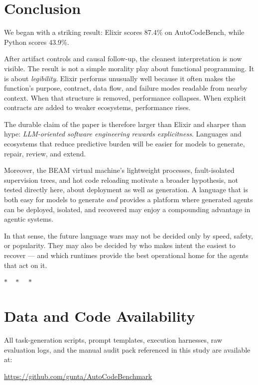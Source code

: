 \documentclass[11pt]{article}
\newcommand{\acb}{AutoCodeBench}
\newcommand{\elixir}{Elixir}
\newcommand{\pythonlang}{Python}
\begin{document}
\section{Conclusion}

We began with a striking result: \elixir{} scores 87.4\% on \acb{}, while \pythonlang{} scores 43.9\%.

After artifact controls and causal follow-up, the cleanest interpretation is now visible. The result is not a simple morality play about functional programming. It is about \emph{legibility}. \elixir{} performs unusually well because it often makes the function's purpose, contract, data flow, and failure modes readable from nearby context. When that structure is removed, performance collapses. When explicit contracts are added to weaker ecosystems, performance rises.

The durable claim of the paper is therefore larger than \elixir{} and sharper than hype: \emph{LLM-oriented software engineering rewards explicitness}. Languages and ecosystems that reduce predictive burden will be easier for models to generate, repair, review, and extend.

Moreover, the BEAM virtual machine's lightweight processes, fault-isolated supervision trees, and hot code reloading motivate a broader hypothesis, not tested directly here, about deployment as well as generation. A language that is both easy for models to generate \emph{and} provides a platform where generated agents can be deployed, isolated, and recovered may enjoy a compounding advantage in agentic systems.

In that sense, the future language wars may not be decided only by speed, safety, or popularity. They may also be decided by who makes intent the easiest to recover --- and which runtimes provide the best operational home for the agents that act on it.

\bigskip
\begin{center}
$\ast\quad\ast\quad\ast$
\end{center}

\section*{Data and Code Availability}
All task-generation scripts, prompt templates, execution harnesses, raw evaluation logs, and the manual audit pack referenced in this study are available at:

\begin{center}
\url{https://github.com/gunta/AutoCodeBenchmark}
\end{center}
\end{document}

